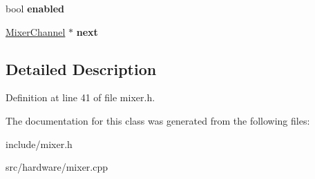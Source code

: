 \begin{DoxyCompactItemize}
\item 
\hypertarget{classMixerChannel_a6965dc347d972ecf8c16bd3c887ea4e5}{bool {\bfseries enabled}}\label{classMixerChannel_a6965dc347d972ecf8c16bd3c887ea4e5}

\item 
\hypertarget{classMixerChannel_aca4b0ddbd84d2e415970c205fdd00e07}{\hyperlink{classMixerChannel}{Mixer\-Channel} $\ast$ {\bfseries next}}\label{classMixerChannel_aca4b0ddbd84d2e415970c205fdd00e07}

\end{DoxyCompactItemize}


\subsection{Detailed Description}


Definition at line 41 of file mixer.\-h.



The documentation for this class was generated from the following files\-:\begin{DoxyCompactItemize}
\item 
include/mixer.\-h\item 
src/hardware/mixer.\-cpp\end{DoxyCompactItemize}

